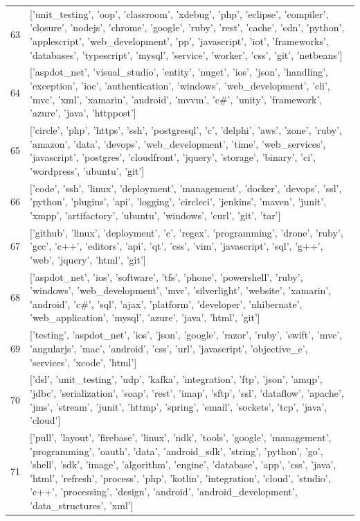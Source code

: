 \begin{center}
\begin{longtable}{|p{1.5cm}|p{12.5cm}|}
            63 & ['unit\_testing', 'oop', 'classroom', 'xdebug', 'php', 'eclipse', 'compiler', 'closure', 'nodejs', 'chrome', 'google', 'ruby', 'rest', 'cache', 'cdn', 'python', 'applescript', 'web\_development', 'pp', 'javascript', 'iot', 'frameworks', 'databases', 'typescript', 'mysql', 'service', 'worker', 'css', 'git', 'netbeans']  \\ 
            64 & ['aspdot\_net', 'visual\_studio', 'entity', 'nuget', 'ios', 'json', 'handling', 'exception', 'ioc', 'authentication', 'windows', 'web\_development', 'cli', 'mvc', 'xml', 'xamarin', 'android', 'mvvm', 'c\#', 'unity', 'framework', 'azure', 'java', 'httppost']  \\ 
            65 & ['circle', 'php', 'https', 'ssh', 'postgresql', 'c', 'delphi', 'aws', 'zone', 'ruby', 'amazon', 'data', 'devops', 'web\_development', 'time', 'web\_services', 'javascript', 'postgres', 'cloudfront', 'jquery', 'storage', 'binary', 'ci', 'wordpress', 'ubuntu', 'git']  \\ 
            66 & ['code', 'ssh', 'linux', 'deployment', 'management', 'docker', 'devops', 'ssl', 'python', 'plugins', 'api', 'logging', 'circleci', 'jenkins', 'maven', 'junit', 'xmpp', 'artifactory', 'ubuntu', 'windows', 'curl', 'git', 'tar']  \\ 
            67 & ['github', 'linux', 'deployment', 'c', 'regex', 'programming', 'drone', 'ruby', 'gcc', 'c++', 'editors', 'api', 'qt', 'css', 'vim', 'javascript', 'sql', 'g++', 'web', 'jquery', 'html', 'git']  \\ 
            68 & ['aspdot\_net', 'ios', 'software', 'tfs', 'phone', 'powershell', 'ruby', 'windows', 'web\_development', 'mvc', 'silverlight', 'website', 'xamarin', 'android', 'c\#', 'sql', 'ajax', 'platform', 'developer', 'nhibernate', 'web\_application', 'mysql', 'azure', 'java', 'html', 'git']  \\ 
            69 & ['testing', 'aspdot\_net', 'ios', 'json', 'google', 'razor', 'ruby', 'swift', 'mvc', 'angularjs', 'mac', 'android', 'css', 'url', 'javascript', 'objective\_c', 'services', 'xcode', 'html']  \\ 
            70 & ['dsl', 'unit\_testing', 'udp', 'kafka', 'integration', 'ftp', 'json', 'amqp', 'jdbc', 'serialization', 'soap', 'rest', 'imap', 'sftp', 'ssl', 'dataflow', 'apache', 'jms', 'stream', 'junit', 'httmp', 'spring', 'email', 'sockets', 'tcp', 'java', 'cloud']  \\ 
            71 & ['pull', 'layout', 'firebase', 'linux', 'ndk', 'tools', 'google', 'management', 'programming', 'oauth', 'data', 'android\_sdk', 'string', 'python', 'go', 'shell', 'sdk', 'image', 'algorithm', 'engine', 'database', 'app', 'css', 'java', 'html', 'refresh', 'process', 'php', 'kotlin', 'integration', 'cloud', 'studio', 'c++', 'processing', 'design', 'android', 'android\_development', 'data\_structures', 'xml']  \\ 

\end{longtable}
\end{center}
